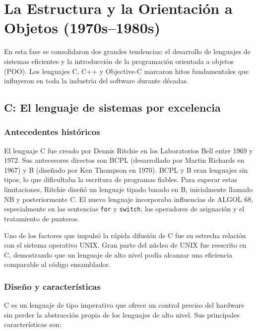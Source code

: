 \chapter{La Estructura y la Orientación a Objetos (1970s–1980s)}

En esta fase se consolidaron dos grandes tendencias: el desarrollo de lenguajes de sistemas eficientes y la introducción de la programación orientada a objetos (POO). Los lenguajes C, C++ y Objective-C marcaron hitos fundamentales que influyeron en toda la industria del software durante décadas.

\section{C: El lenguaje de sistemas por excelencia}

\subsection{Antecedentes históricos}

El lenguaje C fue creado por Dennis Ritchie en los Laboratorios Bell entre 1969 y 1972. Sus antecesores directos son BCPL (desarrollado por Martin Richards en 1967) y B (diseñado por Ken Thompson en 1970). BCPL y B eran lenguajes sin tipos, lo que dificultaba la escritura de programas fiables. Para superar estas limitaciones, Ritchie diseñó un lenguaje tipado basado en B, inicialmente llamado NB y posteriormente C. El nuevo lenguaje incorporaba influencias de ALGOL 68, especialmente en las sentencias \texttt{for} y \texttt{switch}, los operadores de asignación y el tratamiento de punteros.

Uno de los factores que impulsó la rápida difusión de C fue su estrecha relación con el sistema operativo UNIX. Gran parte del núcleo de UNIX fue reescrito en C, demostrando que un lenguaje de alto nivel podía alcanzar una eficiencia comparable al código ensamblador.

\subsection{Diseño y características}

C es un lenguaje de tipo imperativo que ofrece un control preciso del hardware sin perder la abstracción propia de los lenguajes de alto nivel. Sus principales características son:

